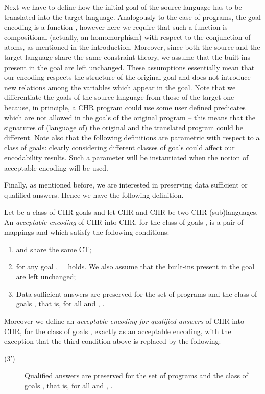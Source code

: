Next we have to define how the initial goal of the source language has to be translated into the target language. Analogously to the case of programs, the goal encoding is a function , however here we require that such a function is compositional (actually, an homomorphism) with respect to the conjunction of atoms, as mentioned in the introduction. Moreover, since both the source and the target language share the same constraint theory, we assume that the built-ins present in the goal are left unchanged. These assumptions  essentially mean that our encoding respects the structure of the original goal and does not introduce new relations among the variables which appear in the goal.
Note that we differentiate the goals  of the source language from those   of the target one because, in principle, a CHR program could use some user defined predicates which are not allowed in the goals of the original program -- this means that the signatures of (language of) the original and the translated program could be different.
Note also that the following definitions are parametric  with respect to a class  of goals: clearly considering different classes of goals could affect our encodability results. Such a parameter will be instantiated when the notion of acceptable encoding will be used.


Finally, as mentioned before, we are interested in preserving data sufficient or qualified answers.  Hence we have the following definition.


\begin{definition}\label{def:resenc}
Let  be  a class of CHR goals and let CHR and CHR be two CHR (sub)languages. An {\em acceptable encoding} of CHR into CHR, for the class of goals , is a pair of mappings  and  which satisfy the following conditions:
\begin{enumerate}
 \item  and   share the same CT;
 \item for any goal ,  =  holds. We also assume that the built-ins present in the goal are left unchanged;
 \item Data sufficient answers are preserved for the set of programs  and the class of goals , that is, for all  and ,
 .
\end{enumerate}
Moreover we define an  {\em acceptable encoding for qualified answers} of CHR into CHR, for the class of goals , exactly as an acceptable encoding, with the exception that the third condition above is replaced by the following:
\begin{description}
 \item[(3')] Qualified answers are preserved for the set of programs  and the class of goals , that is, for all  and  ,
 .
\end{description}
\end{definition}







